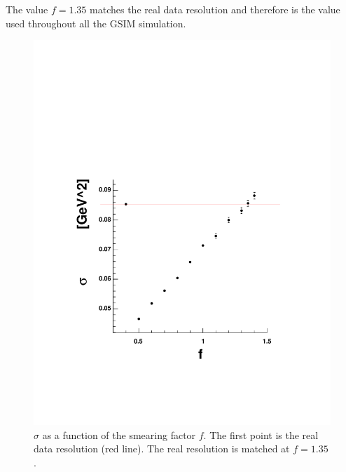 The value $f=1.35$ matches the real data resolution and therefore is the value used throughout all
the GSIM simulation.

\begin{figure}[t]
 \includegraphics[width = 14cm, bb=0 120 620 540]{acceptance/img/all_com_sc}
 \caption[$\sigma$ as a function of the smearing factor $f$]
         { $\sigma$ as a function of the smearing factor $f$. The first point is the
	            real data resolution (red line). The real resolution is matched at $f=1.35$.}
 \label{fig:tof_fit}
\end{figure}



